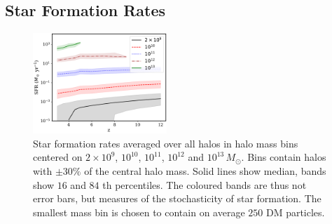 \documentclass[fleqn,usenatbib]{mnras}
\def\astrid{\texttt{Astrid} }
\def\msun{\, M_{\odot}}
\newcommand{\spb}[1]{\textcolor{red}{[\bf SPB: #1]}}
\newcommand{\yueying}[1]{\textcolor{magenta}{[\bf YN: #1]}}
\begin{document}



\subsection{Star Formation Rates}
\label{sec:sfr}


\begin{figure}
\centering
  \includegraphics[width=0.45\textwidth]{plots/avg_sfr.pdf}
  \caption{Star formation rates averaged over all halos in halo mass bins centered on $2\times 10^9$, $10^{10}$, $10^{11}$, $10^{12}$ and $10^{13} \msun$. Bins contain halos with $\pm 30\%$ of the central halo mass. Solid lines show median, bands show $16$ and $84$ th percentiles. The coloured bands are thus not error bars, but measures of the stochasticity of star formation. The smallest mass bin is chosen to contain on average $250$ DM particles.}
  \label{fig:avgsfr}
\end{figure}
\end{document}
